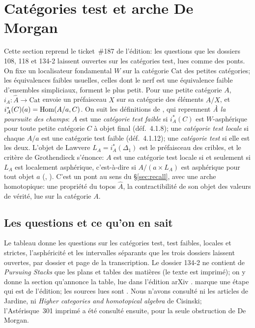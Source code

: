 \section{Catégories test et arche De Morgan}\label{sec:test}

Cette section reprend le ticket~\#187 de l'édition: les questions que les dossiers 108, 118 et 134-2 laissent ouvertes sur les catégories test, lues comme des ponts. On fixe un localisateur fondamental $W$ sur la catégorie $\mathrm{Cat}$ des petites catégories; les équivalences faibles usuelles, celles dont le nerf est une équivalence faible d'ensembles simpliciaux, forment le plus petit. Pour une petite catégorie $A$, $i_A\colon\widehat A\to\mathrm{Cat}$ envoie un préfaisceau $X$ sur sa catégorie des éléments $A/X$, et $i_A^*(C)(a) = \operatorname{Hom}(A/a, C)$. On suit les définitions de \cite[\S4.1]{cisinski-308}, qui reprennent \emph{À la poursuite des champs}: $A$ est une \emph{catégorie test faible} si $i_A^*(C)$ est $W$-asphérique pour toute petite catégorie $C$ à objet final (déf.~4.1.8); une \emph{catégorie test locale} si chaque $A/a$ est une catégorie test faible (déf.~4.1.12); une \emph{catégorie test} si elle est les deux. L'objet de Lawvere $L_A = i_A^*(\Delta_1)$ est le préfaisceau des cribles, et le critère de Grothendieck s'énonce: $A$ est une catégorie test locale si et seulement si $L_A$ est localement asphérique, c'est-à-dire si $A/(a\times L_A)$ est asphérique pour tout objet $a$ (\cite[th.~4.1.19]{cisinski-308}, \cite[th.~6.6]{maltsiniotis-2001}). C'est un pont au sens du \S\ref{sec:recall}, avec une arche homotopique: une propriété du topos $\widehat A$, la contractibilité de son objet des valeurs de vérité, lue sur la catégorie $A$.

\subsection{Les questions et ce qu'on en sait}

Le tableau donne les questions sur les catégories test, test faibles, locales et strictes, l'asphéricité et les intervalles séparants que les trois dossiers laissent ouvertes, par dossier et page de la transcription. Le dossier 134-2 ne contient de \emph{Pursuing Stacks} que les plans et tables des matières (le texte est imprimé); on y donne la section qu'annonce la table, lue dans l'édition arXiv \cite{ps-arxiv}.  marque une étape qui est de l'édition; les sources lues sont \cite{cisinski-308,maltsiniotis-2001,ps-arxiv,hubert-thesis,hubert-dk}. Nous n'avons consulté ni les articles de Jardine, ni \emph{Higher categories and homotopical algebra} de Cisinski; l'Astérisque~301 imprimé \cite{maltsiniotis-301} a été consulté ensuite, pour la seule obstruction de De Morgan.

